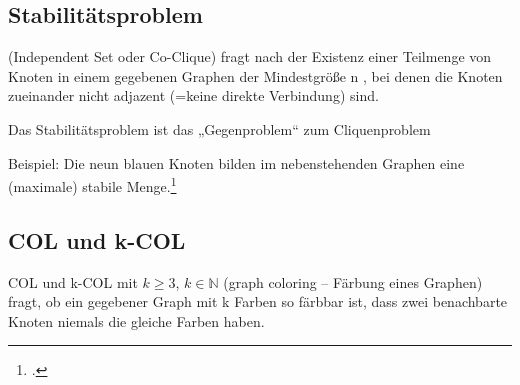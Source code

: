 \documentclass{lehramt-informatik-haupt}
\begin{document}
%

\subsection{Stabilitätsproblem}

(Independent Set oder Co-Clique) fragt nach der Existenz einer Teilmenge
von Knoten in einem gegebenen Graphen der Mindestgröße n , bei denen die
Knoten zueinander nicht adjazent (=keine direkte Verbindung) sind.

Das Stabilitätsproblem ist das „Gegenproblem“ zum Cliquenproblem

Beispiel: Die neun blauen Knoten bilden im nebenstehenden Graphen eine
(maximale) stabile Menge.\footcite[Seite 77]{theo:fs:4}

%

\subsection{COL und k-COL}

COL und k-COL mit $k \geq 3$, $k \in \mathbb{N}$ (graph coloring –
Färbung eines Graphen) fragt, ob ein gegebener Graph mit k Farben so
färbbar ist, dass zwei benachbarte Knoten niemals die gleiche Farben
haben.

\literatur
\end{document}

